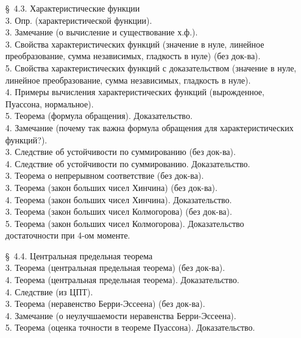 \documentclass[10pt]{amsart}
\begin{document}
\begin{enumerate}
\begin{enumerate}
         
    
\item[\S\, 4.3.] Характеристические функции \\
3. Опр. (характеристической функции). \\
3. Замечание (о вычисление и существование х.ф.). \\
3. Свойства характеристических функций (значение в нуле, линейное преобразование, сумма независимых, гладкость в нуле) (без док-ва). \\
5. Свойства характеристических функций с доказательством (значение в нуле, линейное преобразование, сумма независимых, гладкость в нуле). \\
4. Примеры вычисления характеристических функций (вырожденное, Пуассона, нормальное). \\
5. Теорема (формула обращения). Доказательство. \\
4. Замечание (почему так важна формула обращения для характеристических функций?). \\
3. Следствие об устойчивости по суммированию (без док-ва). \\
4. Следствие об устойчивости по суммированию. Доказательство. \\
3. Теорема о непрерывном соответствие (без док-ва). \\
3. Теорема (закон больших чисел Хинчина) (без док-ва). \\
4. Теорема (закон больших чисел Хинчина).  Доказательство. \\
3. Теорема (закон больших чисел Колмогорова) (без док-ва). \\
5. Теорема (закон больших чисел Колмогорова). Доказательство достаточности при 4-ом моменте. \\

 

\item[\S\, 4.4.] Центральная предельная теорема \\
3. Теорема (центральная предельная теорема) (без док-ва). \\
4. Теорема (центральная предельная теорема). Доказательство. \\        
4. Следствие (из ЦПТ). \\
3. Теорема (неравенство Берри-Эссеена) (без док-ва). \\
4. Замечание (о неулучшаемости неравенства Берри-Эссеена). \\
5. Теорема (оценка точности в теореме Пуассона). Доказательство. \\
    









    \end{enumerate}
    

\end{enumerate}
\end{document}
